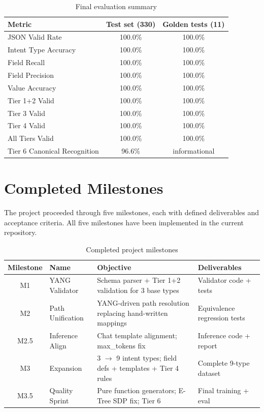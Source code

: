 \documentclass[12pt, a4paper]{article}
\begin{document}
\begin{table}[H]
\centering
\caption{Final evaluation summary}
\label{tab:final-metrics}
\small
\begin{tabular}{lcc}
\toprule
\textbf{Metric} & \textbf{Test set (330)} & \textbf{Golden tests (11)} \\
\midrule
JSON Valid Rate & 100.0\% & 100.0\% \\
Intent Type Accuracy & 100.0\% & 100.0\% \\
Field Recall & 100.0\% & 100.0\% \\
Field Precision & 100.0\% & 100.0\% \\
Value Accuracy & 100.0\% & 100.0\% \\
Tier 1+2 Valid & 100.0\% & 100.0\% \\
Tier 3 Valid & 100.0\% & 100.0\% \\
Tier 4 Valid & 100.0\% & 100.0\% \\
All Tiers Valid & 100.0\% & 100.0\% \\
Tier 6 Canonical Recognition & 96.6\% & informational \\
\bottomrule
\end{tabular}
\end{table}

\section{Completed Milestones}
\label{sec:milestones}

The project proceeded through five milestones, each with defined deliverables and acceptance criteria. All five milestones have been implemented in the current repository.

\begin{table}[H]
\centering
\caption{Completed project milestones}
\label{tab:milestones}
\small
\begin{tabular}{clp{5.5cm}p{3.5cm}}
\toprule
\textbf{Milestone} & \textbf{Name} & \textbf{Objective} & \textbf{Deliverables} \\
\midrule
M1 & YANG Validator &
  Schema parser + Tier 1+2 validation for 3 base types &
  Validator code + tests \\
\addlinespace
M2 & Path Unification &
  YANG-driven path resolution replacing hand-written mappings &
  Equivalence regression tests \\
\addlinespace
M2.5 & Inference Align &
  Chat template alignment; max\_tokens fix &
  Inference code + report \\
\addlinespace
M3 & Expansion &
  3 $\to$ 9 intent types; field defs + templates + Tier 4 rules &
  Complete 9-type dataset \\
\addlinespace
M3.5 & Quality Sprint &
  Pure function generators; E-Tree SDP fix; Tier 6 &
  Final training + eval \\
\bottomrule
\end{tabular}
\end{table}
\end{document}
